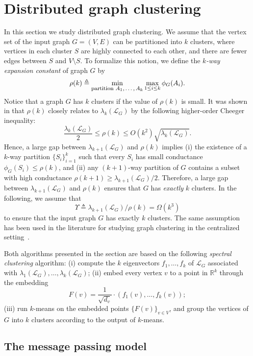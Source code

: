 
\section{Distributed graph  clustering\label{sec:graphmsg}}

In this section we study distributed graph clustering.   We assume that the vertex set of  the input graph $G=(V,E)$ can be partitioned into $k$ clusters, where vertices in each cluster $S$ are highly connected to each other, and there are fewer edges between $S$ and $V\setminus S$.  To formalize this notion, 
 we  define the \emph{$k$-way expansion constant} of graph $G$ by 
\[
\rho(k)\triangleq \min_{\mbox{\footnotesize partition $A_1,\ldots, A_k$}}\max_{1\leq i\leq k}\phi_G(A_i).
\] Notice that a graph $G$ has $k$ clusters if the value of $\rho(k)$ is small. It was shown in \cite{conf/stoc/LeeGT12} that $\rho(k)$ closely relates to  $\lambda_k(\mathcal{L}_G)$ by the following higher-order Cheeger inequality:
\begin{equation*}
\frac{\lambda_k(\mathcal{L}_G)}{2}\leq \rho(k)\leq O(k^2) \sqrt{\lambda_k(\mathcal{L}_G)}.
\end{equation*}
Hence, a large gap between $\lambda_{k+1}(\mathcal{L}_G)$ and $\rho(k)$ implies (i) the existence of 
a $k$-way partition $\{S_i\}_{i=1}^k$ such that every $S_i$ has small conductance
 $\phi_G(S_i)\leq \rho(k)$, and (ii) any $(k+1)$-way partition of $G$ contains a subset with  high conductance $\rho(k+1)\geq \lambda_{k+1}(\mathcal{L}_G)/2$. Therefore, a large gap between $\lambda_{k+1}(\mathcal{L}_G)$ and $\rho(k)$ ensures that $G$ has \emph{exactly} $k$ clusters. In the following, we assume that 
\[
\Upsilon\triangleq \lambda_{k+1}(\mathcal{L}_G)/\rho(k)=\Omega(k^3)
\]  
to ensure that the input graph $G$ has exactly $k$ clusters. The same assumption has been used 
 in the literature for studying graph clustering in the centralized setting~\cite{PSZ15}.

Both algorithms presented in the section are based on the following \emph{spectral clustering} algorithm: (i) compute the  $k$ eigenvectors $f_1,\ldots, f_k$ of $\mathcal{L}_G$ associated with $\lambda_1(\mathcal{L}_G),\ldots,\lambda_k(\mathcal{L}_G)$; (ii) embed every vertex $v$ to a point in $\mathbb{R}^k$ through the embedding 
\[
F(v)=\frac{1}{\sqrt{d_v}}\cdot(f_1(v),\ldots, f_k(v));
\]
 (iii) run $k$-means on the embedded points $\{F(v)\}_{v\in V}$, and group the vertices of $G$ into $k$ clusters according to the output of $k$-means.

\subsection{The message passing model\label{sec:gcmessage}}

